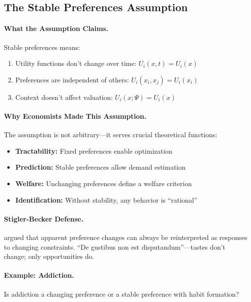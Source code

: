 \documentclass[12pt,a4paper]{article}
\begin{document}
\subsection{The Stable Preferences Assumption}

\paragraph{What the Assumption Claims.}
Stable preferences means:
\begin{enumerate}
  \item Utility functions don't change over time: $U_i(x, t) = U_i(x)$
  \item Preferences are independent of others: $U_i(x_i, x_j) = U_i(x_i)$
  \item Context doesn't affect valuation: $U_i(x; \Psi) = U_i(x)$
\end{enumerate}

\paragraph{Why Economists Made This Assumption.}
The assumption is not arbitrary---it serves crucial theoretical functions:
\begin{itemize}
  \item \textbf{Tractability:} Fixed preferences enable optimization
  \item \textbf{Prediction:} Stable preferences allow demand estimation
  \item \textbf{Welfare:} Unchanging preferences define a welfare criterion
  \item \textbf{Identification:} Without stability, any behavior is ``rational''
\end{itemize}

\paragraph{Stigler-Becker Defense.}
\citet{stiglerbecker1977} argued that apparent preference changes can always
be reinterpreted as responses to changing constraints.
``De gustibus non est disputandum''---tastes don't change; only opportunities do.

\paragraph{Example: Addiction.}
Is addiction a changing preference or a stable preference with habit formation?
\end{document}
